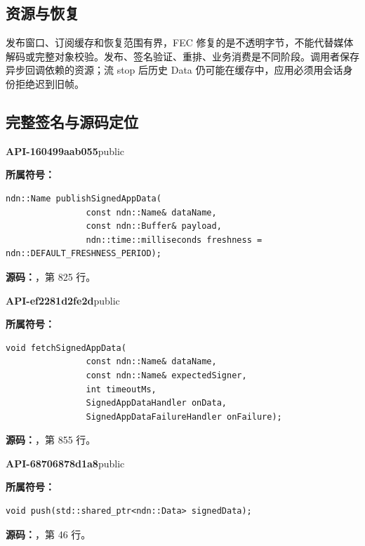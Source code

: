 \subsection{资源与恢复}
发布窗口、订阅缓存和恢复范围有界，FEC 修复的是不透明字节，不能代替媒体解码或完整对象校验。发布、签名验证、重排、业务消费是不同阶段。调用者保存异步回调依赖的资源；流 stop 后历史 Data 仍可能在缓存中，应用必须用会话身份拒绝迟到旧帧。

\subsection{完整签名与源码定位}

\textbf{API-160499aab055}\quad public\par
\textbf{所属符号：}\par
\begin{Verbatim}[fontsize=\footnotesize,breaklines,breakanywhere]
ndn::Name publishSignedAppData(
                const ndn::Name& dataName,
                const ndn::Buffer& payload,
                ndn::time::milliseconds freshness = ndn::DEFAULT_FRESHNESS_PERIOD);
\end{Verbatim}
\textbf{源码：}，第 825 行。\par

\textbf{API-ef2281d2fe2d}\quad public\par
\textbf{所属符号：}\par
\begin{Verbatim}[fontsize=\footnotesize,breaklines,breakanywhere]
void fetchSignedAppData(
                const ndn::Name& dataName,
                const ndn::Name& expectedSigner,
                int timeoutMs,
                SignedAppDataHandler onData,
                SignedAppDataFailureHandler onFailure);
\end{Verbatim}
\textbf{源码：}，第 855 行。\par

\textbf{API-68706878d1a8}\quad public\par
\textbf{所属符号：}\par
\begin{Verbatim}[fontsize=\footnotesize,breaklines,breakanywhere]
void push(std::shared_ptr<ndn::Data> signedData);
\end{Verbatim}
\textbf{源码：}，第 46 行。\par

